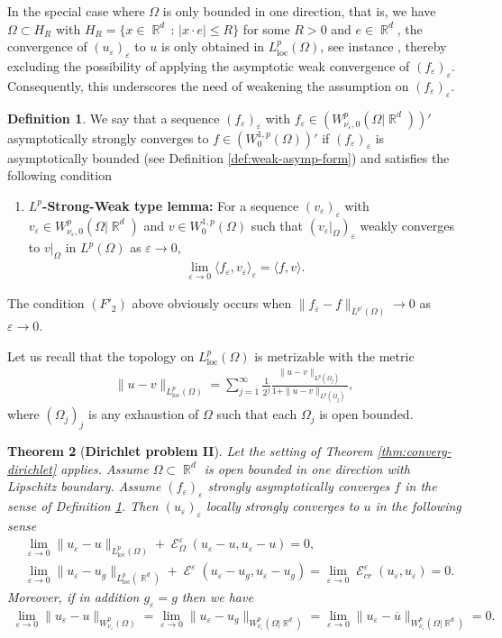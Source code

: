 \documentclass[12pt, reqno]{amsart}%
\theoremstyle{plain}  %
\newtheorem{theorem}{Theorem}[section]
\theoremstyle{definition}  %
\newtheorem{definition}[theorem]{Definition}
\numberwithin{equation}{section}
\DeclareMathOperator{\loc}{loc}
\DeclareMathOperator{\cE}{\mathcal{E}}
\DeclareMathOperator{\R}{\mathbb{R}}
\newcommand{\eps}{\varepsilon}
\newcommand{\WnuOmRao}{W^p_{\nu_\eps,0}(\Omega|\R^d)}
\begin{document}
In the special case where $\Omega$ is only bounded in one direction,  that is,  we have $\Omega\subset H_R$ with $H_R=\{ x\in \R^d\,:\, |x\cdot e|\leq R\}$  for some $R>0$ and $e\in \R^d$, the convergence of $(u_\eps)_\eps$ to $u$ is only obtained in  $L^p_{\loc}(\Omega)$, see instance  \cite{Fog25},  thereby excluding the possibility of applying the asymptotic weak convergence of $(f_\eps)_\eps $.  Consequently,  this underscores the need of  weakening the assumption on $(f_\eps)_\eps$.
\begin{definition}\label{def:strong-asymp-form}
We say that a sequence  $(f_\eps)_\eps$ with $f_\eps\in (W^p_{\nu_\eps,0}(\Omega|\R^d))'$ asymptotically strongly converges to $f\in (W^{1,p}_0(\Omega))'$ if $(f_\eps)_\eps$ is asymptotically bounded (see Definition \ref{def:weak-asymp-form}) and satisfies the following condition
\begin{enumerate}[$(F'_2)$]
\item \textbf{$L^p$-Strong-Weak type lemma:} For  a sequence $(v_\eps)_\eps$ with $v_\eps\in\WnuOmRao$ and $v\in W^{1,p}_0(\Omega)$ such that $(v_\eps|_\Omega)_\eps$ weakly converges  to $ v|_\Omega$  in $L^p(\Omega)$  as $\eps\to 0$,
\begin{align*}
\lim_{\eps\to0} \langle f_\eps , v_\eps \rangle_\eps
= \langle f , v\rangle .
\end{align*}
\end{enumerate}
The condition $(F'_2)$ above obviously occurs when  $\|f_\eps-f\|_{L^{p'}(\Omega)}\to0$ as $\eps\to0$.
\end{definition}
\noindent Let us recall that the topology on $L^p_{\loc}(\Omega)$ is metrizable with the metric
\begin{align*}
\|u-v\|_{L^p_{\loc}(\Omega)}= \sum_{j=1}^{\infty}\frac{1}{2^j}\frac{\| u-v\|_{L^p(\Omega_j)}}{1+\| u-v\|_{L^p(\Omega_j)}},
\end{align*}
where $(\Omega_j)_j$ is any exhaustion of $\Omega$ such that each $\Omega_j$ is  open bounded.

\begin{theorem}[\textbf{Dirichlet problem II}]\label{thm:converg-dirichlet-bis}
Let the setting of Theorem \ref{thm:converg-dirichlet} applies. Assume $\Omega\subset \R^d$ is open bounded in one direction with Lipschitz boundary. Assume $(f_\eps)_\eps$ strongly asymptotically converges $f$ in the sense of Definition \ref{def:strong-asymp-form}.
\noindent Then $(u_\eps)_\eps$ locally strongly converges to $u$ in the following sense
\begin{align*}
&\lim_{\eps\to0}\|u_{\eps}-u\|_{L^p_{\loc}(\Omega)}+ \cE^\eps_\Omega(u_{\eps}-u,u_{\eps}-u)= 0,\\
&\lim_{\eps\to0}\|u_{\eps}-u_g\|_{L^p_{\loc}(\R^d)}+ \cE^\eps(u_{\eps}-u_g,u_{\eps}-u_g)=\lim_{\eps\to0}\cE^\eps_{cr}(u_\eps, u_\eps)= 0.
\end{align*}
Moreover, if in addition $g_\eps= g$ then we have
\begin{align*}
\lim_{\eps\to0}\|u_{\eps}-u\|_{W^p_{\nu_\eps}(\Omega)}
=\lim_{\eps\to0}\|u_{\eps}-u_g\|_{W^p_{\nu_\eps}
(\Omega| \R^d)}
=\lim_{\eps\to0}\|u_{\eps}-\overline{u}\|_{W^p_{\nu_\eps}(\Omega| \R^d)}=0.
\end{align*}
\end{theorem}
\end{document}
